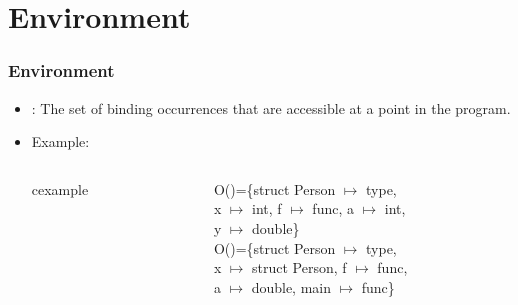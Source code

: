 \section{Environment}
\begin{frame}
 \frametitle{Environment}
\begin{itemize}[<+->]
 \item {}: The set of binding occurrences that are accessible at a
 point in the program.
\item Example: \\
\begin{columns}

\begin{column}{.45\linewidth}
\begin{beamercolorbox}{cexample}
 \codeenvC
\end{beamercolorbox}
\end{column}

\begin{column}{.55\linewidth}\small
\noindent
O()=\{struct Person $\mapsto$ type,\\
 x $\mapsto$ int, f $\mapsto$ func, a $\mapsto$ int, \\
y $\mapsto$ double\}\\[2em]
O()=\{struct Person $\mapsto$ type,\\
x $\mapsto$ struct Person, f $\mapsto$ func, \\
a $\mapsto$ double, main $\mapsto$ func\}\\
\end{column}
\end{columns}

\end{itemize}
\end{frame}

